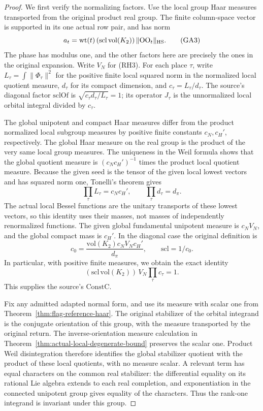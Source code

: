 \begin{proof}
We first verify the normalizing factors. Use the local group Haar
measures transported from the original product real group.
The finite column-space vector is supported in its one actual row
pair, and has norm
\[
 a_t=\mathrm{wt}(t)\,(\mathrm{scl}\,\mathrm{vol}(K_2))\,
                        \|\mathrm{OO}_t\|_{\rm HS}.
 \tag{GA3}
\]
The phase has modulus one, and the other factors here are precisely
the ones in the original expansion. Write \(V_N\) for (RH3). For
each place \(\tau\), write \(L_\tau=\int\|\Phi_\tau\|^2\) for the
positive finite local squared norm in the normalized local quotient
measure, \(d_\tau\) for its compact dimension, and \(c_\tau=L_\tau/d_\tau\).
The source's diagonal factor \(\mathrm{sclOf}\) is
\(\sqrt{c_\tau d_\tau/L_\tau}=1\); its operator \(J_\tau\) is the
unnormalized local orbital integral divided by \(c_\tau\).

The global unipotent and compact Haar measures differ from the
product normalized local subgroup measures by positive finite
constants \(c_N,c_H'\), respectively. The global Haar measure
on the real group is the product of the very same local group
measures. The uniqueness in the Weil formula shows that the global
quotient measure is \((c_Nc_H')^{-1}\) times the product local quotient
measure. Because the given seed is the tensor of the given local
lowest vectors and has squared norm one, Tonelli's theorem gives
\[
 \prod_\tau L_\tau=c_Nc_H',\qquad
 \prod_\tau d_\tau=d_\pi .
\]
The actual local Bessel functions are the unitary transports of
these lowest vectors, so this identity uses their masses, not
masses of independently renormalized functions. The given global
fundamental unipotent measure is \(c_N V_N\), and the global compact
mass is \(c_H'\). In the diagonal case the original definition is
\[
 c_0=\frac{\mathrm{vol}(K_2)c_NV_Nc_H'}{d_\pi},
 \qquad \mathrm{scl}=1/c_0 .
\]
In particular, with positive finite measures, we obtain the exact
identity
\[
       (\mathrm{scl}\,\mathrm{vol}(K_2))\,V_N
                 \prod_\tau c_\tau=1 .
 \tag{GA4}
\]
This supplies the source's \(\mathrm{ConstC}\).

Fix any admitted adapted normal form, and use its measure with
scalar one from Theorem~\ref{thm:flag-reference-haar}.
The original stabilizer of the orbital integrand is the conjugate
orientation of this group, with the measure transported by the
original return. The inverse-orientation measure calculation
in Theorem~\ref{thm:actual-local-degenerate-bound} preserves the
scalar one. Product Weil disintegration therefore identifies
the global stabilizer quotient with the product of these local
quotients, with no measure scalar. A relevant term has equal
characters on the common real stabilizer: the differential equality
on its rational Lie algebra extends to each real completion,
and exponentiation in the connected unipotent group gives equality
of the characters. Thus the rank-one integrand is invariant
under this group.


\end{proof}
